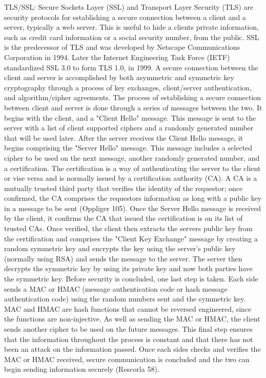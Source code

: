 TLS/SSL:
	Secure Sockets Layer (SSL) and Transport Layer Security (TLS) are security protocols for establishing a secure connection between a client and a server, typically a web server.  This is useful to hide a clients private information, such as credit card information or a social security number, from the public.  SSL is the predecessor of TLS and was developed by Netscape Communications Corporation in 1994.  Later the Internet Engineering Task Force (IETF) standardized SSL 3.0 to form TLS 1.0, in 1999.  A secure connection between the client and server is accomplished by both asymmetric and symmetric key cryptography through a process of key exchanges, client/server authentication, and algorithm/cipher agreements.
	The process of establishing a secure connection between client and server is done through a series of messages between the two.  It begins with the client, and a "Client Hello" message.  This message is sent to the server with a list of client supported ciphers and a randomly generated number that will be used later.  After the server receives the Client Hello message, it begins comprising the "Server Hello" message.  This message includes a selected cipher to be used on the next message, another randomly generated number, and a certification.  The certification is a way of authenticating the server to the client or vise versa and is normally issued by a certification authority (CA).  A CA is a mutually trusted third party that verifies the identity of the requestor; once confirmed, the CA comprises the requestors information as long with a public key in a message to be sent (Oppliger 105).  Once the Server Hello message is received by the client, it confirms the CA that issued the certification is on its list of trusted CAs.  Once verified, the client then extracts the servers public key from the certification and comprises the "Client Key Exchange" message by creating a random symmetric key and encrypts the key using the server's public key (normally using RSA) and sends the message to the server.  The server then decrypts the symmetric key by using its private key and now both parties have the symmetric key.  Before security is concluded, one last step is taken.  Each side sends a MAC or HMAC (message authentication code or hash message authentication code) using the random numbers sent and the symmetric key.  MAC and HMAC are hash functions that cannot be reversed engineered, since the functions are non-injective.  As well as sending the MAC or HMAC, the client sends another cipher to be used on the future messages.  This final step ensures that the information throughout the process is constant and that there has not been an attack on the information passed.  Once each sides checks and verifies the MAC or HMAC received, secure communication is concluded and the two can begin sending information securely (Rescorla 58).   
